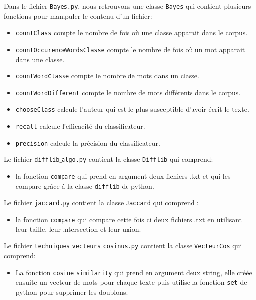 \documentclass[french,12pt]{article}
\begin{document}
Dans le fichier \texttt{Bayes.py}, nous retrouvons une classe \texttt{Bayes} qui contient plusieurs fonctions pour manipuler le contenu d'un fichier:
\begin{itemize}
	\item \texttt{countClass} compte le nombre de fois où une classe
	apparait dans le corpus.
	\item \texttt{countOccurenceWordsClasse} compte le nombre de fois où un
	mot apparait dans une classe.
	\item \texttt{countWordClasse} compte le nombre de mots dans un classe.
	\item \texttt{countWordDifferent} compte le nombre de mots différents
	dans le corpus.
	\item \texttt{chooseClass} calcule l'auteur qui est le plus susceptible
	d'avoir écrit le texte.
	\item \texttt{recall} calcule l'efficacité du classificateur.
	\item \texttt{precision} calcule la précision du classificateur.\\
\end{itemize}
Le fichier \texttt{difflib$\_$algo.py}  contient la classe \texttt{Difflib} qui comprend:
\begin{itemize}
\item la fonction \texttt{compare} qui prend en argument deux fichiers .txt et qui les compare grâce à la classe \texttt{difflib} de python.\\
\end{itemize}
Le fichier \texttt{jaccard.py} contient la classe \texttt{Jaccard} qui comprend :
\begin{itemize}
    \item la fonction \texttt{compare} qui compare cette fois ci deux fichiers .txt  en utilisant leur taille, leur intersection et leur union.\\
\end{itemize}


Le fichier \texttt{techniques$\_$vecteurs$\_$cosinus.py} contient la classe \texttt{VecteurCos} qui comprend:
\begin{itemize}
    \item La fonction \texttt{cosine$ \_$similarity} qui prend en argument deux string, elle créée ensuite un vecteur de mots pour chaque texte puis utilise la fonction \texttt{set} de python pour supprimer les doublons.\\

\end{itemize}
\end{document}
